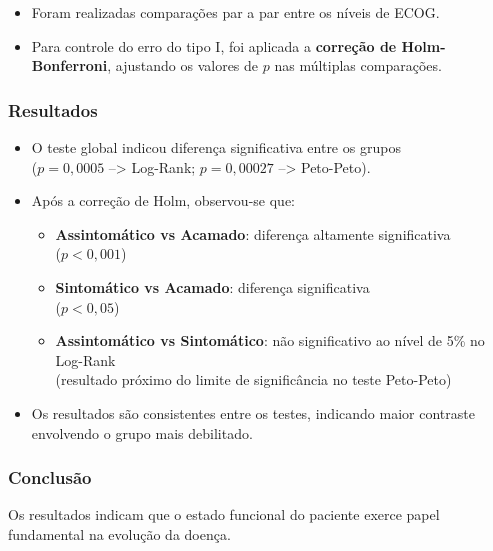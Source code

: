 \documentclass[
  brazilian,
  letterpaper,
  DIV=11,
  numbers=noendperiod]{scrartcl}
\providecommand{\tightlist}{%
  \setlength{\itemsep}{0pt}\setlength{\parskip}{0pt}}
\begin{document}
\begin{itemize}
\item
  Foram realizadas comparações par a par entre os níveis de ECOG.
\item
  Para controle do erro do tipo I, foi aplicada a \textbf{correção de
  Holm-Bonferroni}, ajustando os valores de \(p\) nas múltiplas
  comparações.
\end{itemize}

\subsubsection{\texorpdfstring{\textbf{Resultados}}{Resultados}}\label{resultados-2}

\begin{itemize}
\item
  O teste global indicou diferença significativa entre os grupos\\
  (\(p = 0,0005\) --\textgreater{} Log-Rank; \(p = 0,00027\)
  --\textgreater{} Peto-Peto).
\item
  Após a correção de Holm, observou-se que:

  \begin{itemize}
  \tightlist
  \item
    \textbf{Assintomático vs Acamado}: diferença altamente
    significativa\\
    (\(p < 0,001\))
  \item
    \textbf{Sintomático vs Acamado}: diferença significativa\\
    (\(p < 0,05\))
  \item
    \textbf{Assintomático vs Sintomático}: não significativo ao nível de
    5\% no Log-Rank\\
    (resultado próximo do limite de significância no teste Peto-Peto)
  \end{itemize}
\item
  Os resultados são consistentes entre os testes, indicando maior
  contraste envolvendo o grupo mais debilitado.
\end{itemize}

\subsubsection{\texorpdfstring{\textbf{Conclusão}}{Conclusão}}\label{conclusuxe3o-1}

Os resultados indicam que o estado funcional do paciente exerce papel
fundamental na evolução da doença.
\end{document}
